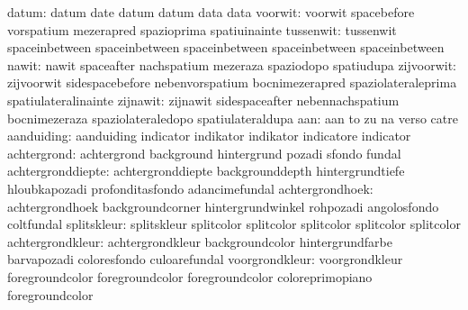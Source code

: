                     datum: datum                     date
                           datum                     datum
                           data                      data
                  voorwit: voorwit                   spacebefore
                           vorspatium                mezerapred
                           spazioprima               spatiuinainte
                tussenwit: tussenwit                 spaceinbetween
                           spaceinbetween            spaceinbetween
                           spaceinbetween            spaceinbetween
                    nawit: nawit                     spaceafter
                           nachspatium               mezeraza
                           spaziodopo                spatiudupa
               zijvoorwit: zijvoorwit                sidespacebefore
                           nebenvorspatium           bocnimezerapred
                           spaziolateraleprima       spatiulateralinainte
                 zijnawit: zijnawit                  sidespaceafter
                           nebennachspatium          bocnimezeraza
                           spaziolateraledopo        spatiulateraldupa
                      aan: aan                       to
                           zu                        na
                           verso                     catre
               aanduiding: aanduiding                indicator
                           indikator                 indikator
                           indicatore                indicator
              achtergrond: achtergrond               background
                           hintergrund               pozadi
                           sfondo                    fundal
        achtergronddiepte: achtergronddiepte         backgrounddepth
                           hintergrundtiefe          hloubkapozadi
                           profonditasfondo          adancimefundal
          achtergrondhoek: achtergrondhoek           backgroundcorner
                           hintergrundwinkel         rohpozadi
                           angolosfondo              coltfundal
splitskleur: splitskleur splitcolor 
             splitcolor  splitcolor 
             splitcolor  splitcolor 
         achtergrondkleur: achtergrondkleur          backgroundcolor
                           hintergrundfarbe          barvapozadi
                           coloresfondo              culoarefundal
           voorgrondkleur: voorgrondkleur            foregroundcolor
                           foregroundcolor           foregroundcolor
                           coloreprimopiano          foregroundcolor
